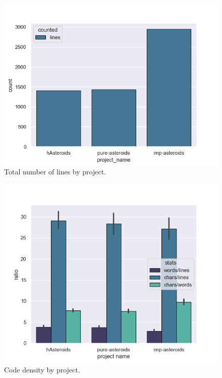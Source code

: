 \documentclass[
  digital, %
  color,   %
  table,   %
  oneside, %
  lof,     %
  lot,     %
]{fithesis3}
\begin{document}
{\begin{figure}
    \centering
    \includegraphics[width=\textwidth]{images/total_lines_by_project.png}
    \caption{Total number of lines by project.}
    \label{fig:codelength}
\end{figure}

\begin{figure}
    \centering
    \includegraphics[width=\textwidth]{images/lwc_density_by_project.png}
    \caption{Code density by project.}
    \label{fig:codedensity}
\end{figure}

}
\end{document}
